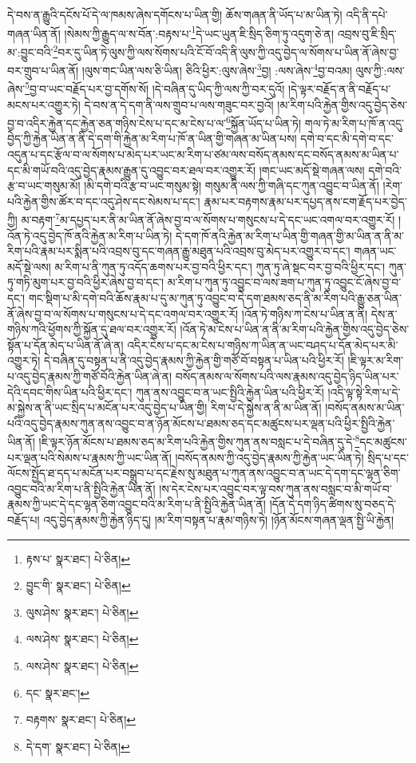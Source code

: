 དེ་བས་ན་རྒྱུའི་དངོས་པོ་དེ་ལ་ཁམས་ཞེས་དགོངས་པ་ཡིན་གྱི། ཆོས་གཞན་ནི་ཡོད་པ་མ་ཡིན་ཏེ། འདི་ནི་དཔེ་གཞན་ཡིན་ནོ། །སེམས་ཀྱི་རྒྱུད་ལ་ས་བོན་:བརྟས་པ་\footnote{རྟས་པ་  སྣར་ཐང་།  པེ་ཅིན། }དེ་ཡང་ཡུན་ཇི་སྲིད་ཅིག་ཏུ་འདུག་ཅེ་ན། འབྲས་བུ་ཇི་སྲིད་མ་:བྱུང་བའི་\footnote{བྱུང་གི་  སྣར་ཐང་།  པེ་ཅིན། }བར་དུ་ཡིན་ཏེ་ལུས་ཀྱི་ལས་སོགས་པའི་ངོ་བོ་འདི་ནི་ལུས་ཀྱི་འདུ་བྱེད་ལ་སོགས་པ་ཡིན་ནོ་ཞེས་བྱ་བར་གྲུབ་པ་ཡིན་ནོ། །ལུས་གང་ཡིན་ལས་ཅི་ཡིན། ཅིའི་ཕྱིར་:ལུས་ཞེས་\footnote{ལུས་ཤེས་  སྣར་ཐང་།  པེ་ཅིན། }བྱ། :ལས་ཞེས་\footnote{ལས་ཤེས་  སྣར་ཐང་།  པེ་ཅིན། }བྱ་བའམ། ལུས་ཀྱི་:ལས་ཞེས་\footnote{ལས་ཤེས་  སྣར་ཐང་།  པེ་ཅིན། }བྱ་བ་ཡང་བརྗོད་པར་བྱ་དགོས་སོ། །དེ་བཞིན་དུ་ཡིད་ཀྱི་ལས་ཀྱི་བར་དུའོ། །དེ་ལྟར་བརྗོད་ན་ནི་བརྗོད་པ་མངས་པར་འགྱུར་ཏེ། དེ་བས་ན་དེ་དག་ནི་ལས་གྲུབ་པ་ལས་གཟུང་བར་བྱའོ། །མ་རིག་པའི་རྐྱེན་གྱིས་འདུ་བྱེད་ཅེས་བྱ་བ་འདིར་རྐྱེན་དང་རྐྱེན་ཅན་གཉིས་ངེས་པ་དང་མ་ངེས་པ་ལ་\footnote{དང་  སྣར་ཐང་། }སྐྱོན་ཡོད་པ་ཡིན་ཏེ། གལ་ཏེ་མ་རིག་པ་ཁོ་ན་འདུ་བྱེད་ཀྱི་རྐྱེན་ཡིན་ན་ནི་དེ་དག་གི་རྐྱེན་མ་རིག་པ་ཁོ་ན་ཡིན་གྱི་གཞན་མ་ཡིན་པས། དགེ་བ་དང་མི་དགེ་བ་དང་འདུན་པ་དང་རྩོལ་བ་ལ་སོགས་པ་མེད་པར་ཡང་མ་རིག་པ་ཙམ་ལས་བསོད་ནམས་དང་བསོད་ནམས་མ་ཡིན་པ་དང་མི་གཡོ་བའི་འདུ་བྱེད་རྣམས་རྒྱུན་དུ་འབྱུང་བར་ཐལ་བར་འགྱུར་རོ། །གང་ཡང་མདོ་སྡེ་གཞན་ལས། དགེ་བའི་རྩ་བ་ཡང་གསུམ་མོ། །མི་དགེ་བའི་རྩ་བ་ཡང་གསུམ་སྟེ། གསུམ་ནི་ལས་ཀྱི་གཞི་དང་ཀུན་འབྱུང་བ་ཡིན་ནོ། །རེག་པའི་རྐྱེན་གྱིས་ཚོར་བ་དང་འདུ་ཤེས་དང་སེམས་པ་དང་། རྣམ་པར་བརྟགས་རྣམ་པར་དཔྱད་ནས་ངག་རྗོད་པར་བྱེད་ཀྱི། མ་བརྟག་\footnote{བརྟགས་  སྣར་ཐང་།  པེ་ཅིན། }མ་དཔྱད་པར་ནི་མ་ཡིན་ནོ་ཞེས་བྱ་བ་ལ་སོགས་པ་གསུངས་པ་དེ་དང་ཡང་འགལ་བར་འགྱུར་རོ། །འོན་ཏེ་འདུ་བྱེད་ཁོ་ནའི་རྐྱེན་མ་རིག་པ་ཡིན་ཏེ། དེ་དག་ཁོ་ནའི་རྐྱེན་མ་རིག་པ་ཡིན་གྱི་གཞན་གྱི་མ་ཡིན་ན་ནི་མ་རིག་པའི་རྣམ་པར་སྨིན་པའི་འབྲས་བུ་དང་གཞན་རྒྱུ་མཐུན་པའི་འབྲས་བུ་མེད་པར་འགྱུར་བ་དང་། གཞན་ཡང་མདོ་སྡེ་ལས། མ་རིག་པ་ནི་ཀུན་ཏུ་འདོད་ཆགས་པར་བྱ་བའི་ཕྱིར་དང་། ཀུན་ཏུ་ཞེ་སྡང་བར་བྱ་བའི་ཕྱིར་དང་། ཀུན་ཏུ་གཏི་མུག་པར་བྱ་བའི་ཕྱིར་ཞེས་བྱ་བ་དང་། མ་རིག་པ་ཀུན་ཏུ་འབྱུང་བ་ལས་ཟག་པ་ཀུན་ཏུ་འབྱུང་ངོ་ཞེས་བྱ་བ་དང་། གང་སྡིག་པ་མི་དགེ་བའི་ཆོས་རྣམ་པ་དུ་མ་ཀུན་ཏུ་འབྱུང་བ་དེ་དག་ཐམས་ཅད་ནི་མ་རིག་པའི་རྒྱུ་ཅན་ཡིན་ནོ་ཞེས་བྱ་བ་ལ་སོགས་པ་གསུངས་པ་དེ་དང་འགལ་བར་འགྱུར་རོ། །འོན་ཏེ་གཉིས་ཀ་ངེས་པ་ཡིན་ན་ནི། དེས་ན་གཉིས་ཀའི་ཕྱོགས་ཀྱི་སྐྱོན་དུ་ཐལ་བར་འགྱུར་རོ། །འོན་ཏེ་མ་ངེས་པ་ཡིན་ན་ནི་མ་རིག་པའི་རྐྱེན་གྱིས་འདུ་བྱེད་ཅེས་སྟོན་པ་དོན་མེད་པ་ཡིན་ནོ་ཞེ་ན། འདིར་ངེས་པ་དང་མ་ངེས་པ་གཉིས་ཀ་ཡིན་ན་ཡང་བཤད་པ་དོན་མེད་པར་མི་འགྱུར་ཏེ། དེ་བཞིན་དུ་བསྟན་པ་ནི་འདུ་བྱེད་རྣམས་ཀྱི་རྐྱེན་གྱི་གཙོ་བོ་བསྟན་པ་ཡིན་པའི་ཕྱིར་རོ། །ཇི་ལྟར་མ་རིག་པ་འདུ་བྱེད་རྣམས་ཀྱི་གཙོ་བོའི་རྐྱེན་ཡིན་ཞེ་ན། བསོད་ནམས་ལ་སོགས་པའི་ལས་རྣམས་འདུ་བྱེད་ཉིད་ཡིན་པར་དེའི་དབང་གིས་ཡིན་པའི་ཕྱིར་དང་། ཀུན་ནས་འབྱུང་བ་ན་ཡང་སྤྱིའི་རྐྱེན་ཡིན་པའི་ཕྱིར་རོ། །འདི་ལྟ་སྟེ་རིག་པ་དེ་མ་སྐྱེས་ན་ནི་ཡང་སྲིད་པ་མངོན་པར་འདུ་བྱེད་པ་ཡིན་གྱི། རིག་པ་དེ་སྐྱེས་ན་ནི་མ་ཡིན་ནོ། །བསོད་ནམས་མ་ཡིན་པའི་འདུ་བྱེད་རྣམས་ཀུན་ནས་འབྱུང་བ་ན་ཉོན་མོངས་པ་ཐམས་ཅད་དང་མཚུངས་པར་ལྡན་པའི་ཕྱིར་སྤྱིའི་རྐྱེན་ཡིན་ནོ། །ཇི་ལྟར་ཉོན་མོངས་པ་ཐམས་ཅད་མ་རིག་པའི་རྐྱེན་གྱིས་ཀུན་ནས་བསླང་པ་དེ་བཞིན་དུ་དེ་\footnote{དེ་དག་  སྣར་ཐང་།  པེ་ཅིན། }དང་མཚུངས་པར་ལྡན་པའི་སེམས་པ་རྣམས་ཀྱི་ཡང་ཡིན་ནོ། །བསོད་ནམས་ཀྱི་འདུ་བྱེད་རྣམས་ཀྱི་རྐྱེན་ཡང་ཡིན་ཏེ། སྲིད་པ་དང་ལོངས་སྤྱོད་ཐ་དད་པ་མངོན་པར་བསྒྲུབ་པ་དང་རྗེས་སུ་མཐུན་པ་ཀུན་ནས་འབྱུང་བ་ན་ཡང་དེ་དག་དང་ལྷན་ཅིག་འབྱུང་བའི་མ་རིག་པ་ནི་སྤྱིའི་རྐྱེན་ཡིན་ནོ། །ས་དེར་ངེས་པར་འབྱུང་བར་ལྟ་བས་ཀུན་ནས་བསླང་བ་མི་གཡོ་བ་རྣམས་ཀྱི་ཡང་དེ་དང་ལྷན་ཅིག་འབྱུང་བའི་མ་རིག་པ་ནི་སྤྱིའི་རྐྱེན་ཡིན་ནོ། །དོན་དེ་དག་ཉིད་ཚིགས་སུ་བཅད་དེ་བརྗོད་པ། འདུ་བྱེད་རྣམས་ཀྱི་རྐྱེན་ཉིད་དུ། །མ་རིག་བསྟན་པ་རྣམ་གཉིས་ཏེ། །ཉོན་མོངས་གཞན་ལྡན་སྤྱི་ཡི་རྐྱེན། 